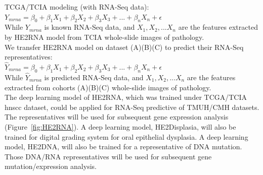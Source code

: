 \documentclass[12pt, a4paper]{article}
\begin{document}


TCGA/TCIA modeling (with RNA-Seq data):\\[0.2cm]
$Y_{mrna} = \beta_0 + \beta_1 X_1 + \beta_2 X_2 + \beta_3 X_3 + ... + \beta_n X_n + \epsilon$\\[0.3cm]
While 
$Y_{mrna}$ is known RNA-Seq data, and
$X_1, X_2, ...X_n$ are the features extracted by HE2RNA model from TCIA whole-slide images of pathology.\\[0.5cm]

We transfer HE2RNA model on dataset (A)(B)(C) to predict their RNA-Seq representatives:\\[0.2cm]
$\hat{Y}_{mrna} = \beta_0 + \beta_1 X_1 + \beta_2 X_2 + \beta_3 X_3 + ... + \beta_n X_n + \epsilon$\\[0.3cm]
While $\hat{Y}_{mrna}$ is predicted RNA-Seq data, and
$X_1, X_2, ...X_n$ are the features extracted from cohorts (A)(B)(C) whole-slide images of pathology.\\
The deep learning model of HE2RNA, which was trained under TCGA/TCIA \acrshort{hnscc} dataset, could be applied for RNA-Seq predictive of TMUH/CMH datasets. 
The representatives will be used for subsequent gene expression analysis (Figure~\ref{fig:HE2RNA}).
A deep learning model, HE2Displasia, will also be trained for digital grading system for oral epithelial dysplasia.
A deep learning model, HE2DNA, will also be trained for a representative of DNA mutation.
Those DNA/RNA representatives will be used for subsequent gene mutation/expression analysis.

\end{document}
